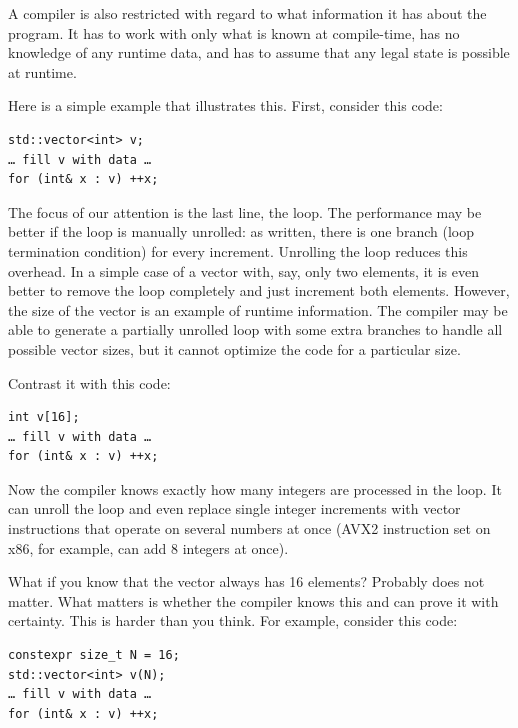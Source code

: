 A compiler is also restricted with regard to what information it has about the program. It has to work with only what is known at compile-time, has no knowledge of any runtime data, and has to assume that any legal state is possible at runtime.

Here is a simple example that illustrates this. First, consider this code:

\begin{lstlisting}[style=styleCXX]
std::vector<int> v;
… fill v with data … 
for (int& x : v) ++x;
\end{lstlisting}

The focus of our attention is the last line, the loop. The performance may be better if the loop is manually unrolled: as written, there is one branch (loop termination condition) for every increment. Unrolling the loop reduces this overhead. In a simple case of a vector with, say, only two elements, it is even better to remove the loop completely and just increment both elements. However, the size of the vector is an example of runtime information. The compiler may be able to generate a partially unrolled loop with some extra branches to handle all possible vector sizes, but it cannot optimize the code for a  particular size.

Contrast it with this code:

\begin{lstlisting}[style=styleCXX]
int v[16];
… fill v with data … 
for (int& x : v) ++x;
\end{lstlisting}

Now the compiler knows exactly how many integers are processed in the loop. It can unroll the loop and even replace single integer increments with vector instructions that operate on several numbers at once (AVX2 instruction set on x86, for example, can add 8 integers at once). 

What if you know that the vector always has 16 elements? Probably does not matter. What matters is whether the compiler knows this and can prove it with certainty. This is harder than you think. For example, consider this code:

\begin{lstlisting}[style=styleCXX]
constexpr size_t N = 16;
std::vector<int> v(N);
… fill v with data … 
for (int& x : v) ++x;
\end{lstlisting}

